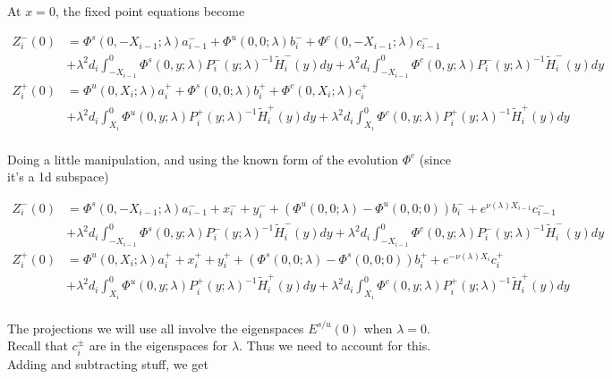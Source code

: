 \documentclass[12pt]{article}
\begin{document}
At $x = 0$, the fixed point equations become

\begin{align*}
Z_i^-(0) &= \Phi^s(0, -X_{i-1}; \lambda) a_{i-1}^- + \Phi^u(0, 0; \lambda) b_i^- + \Phi^c(0, -X_{i-1}; \lambda) c_{i-1}^- \\
&+ \lambda^2 d_i \int_{-X_{i-1}}^0 \Phi^s(0, y; \lambda) P_i^-(y; \lambda)^{-1} \tilde{H}_i^-(y) dy 
+ \lambda^2 d_i \int_{-X_{i-1}}^0 \Phi^c(0, y; \lambda) P_i^-(y; \lambda)^{-1} \tilde{H}_i^-(y) dy  \\ 
Z_i^+(0) &= \Phi^u(0, X_i; \lambda) a_i^+ + \Phi^s(0, 0; \lambda) b_i^+ + \Phi^c(0, X_i; \lambda) c_i^+ \\
&+ \lambda^2 d_i \int_{X_i}^0 \Phi^u(0, y; \lambda) P_i^+(y; \lambda)^{-1} \tilde{H}_i^+(y) dy 
+ \lambda^2 d_i \int_{X_i}^0 \Phi^c(0, y; \lambda) P_i^+(y; \lambda)^{-1} \tilde{H}_i^+(y) dy \\
\end{align*}

Doing a little manipulation, and using the known form of the evolution $\Phi^c$ (since it's a 1d subspace)

\begin{align*}
Z_i^-(0) &= \Phi^s(0, -X_{i-1}; \lambda) a_{i-1}^- + x_i^- + y_i^- + (\Phi^u(0, 0; \lambda) - \Phi^u(0, 0; 0))b_i^- + e^{\nu(\lambda) X_{i-1}} c_{i-1}^- \\
&+ \lambda^2 d_i \int_{-X_{i-1}}^0 \Phi^s(0, y; \lambda) P_i^-(y; \lambda)^{-1} \tilde{H}_i^-(y) dy 
+ \lambda^2 d_i \int_{-X_{i-1}}^0 \Phi^c(0, y; \lambda) P_i^-(y; \lambda)^{-1} \tilde{H}_i^-(y) dy  \\ 
Z_i^+(0) &= \Phi^u(0, X_i; \lambda) a_i^+ + x_i^+ + y_i^+ + (\Phi^s(0, 0; \lambda) - \Phi^s(0, 0; 0)) b_i^+ + e^{-\nu(\lambda)X_i} c_i^+ \\
&+ \lambda^2 d_i \int_{X_i}^0 \Phi^u(0, y; \lambda) P_i^+(y; \lambda)^{-1} \tilde{H}_i^+(y) dy 
+ \lambda^2 d_i \int_{X_i}^0 \Phi^c(0, y; \lambda) P_i^+(y; \lambda)^{-1} \tilde{H}_i^+(y) dy \\
\end{align*}

The projections we will use all involve the eigenspaces $E^{s/u}(0)$ when $\lambda = 0$. Recall that $c_i^\pm$ are in the eigenspaces for $\lambda$. Thus we need to account for this. Adding and subtracting stuff, we get
\end{document}
